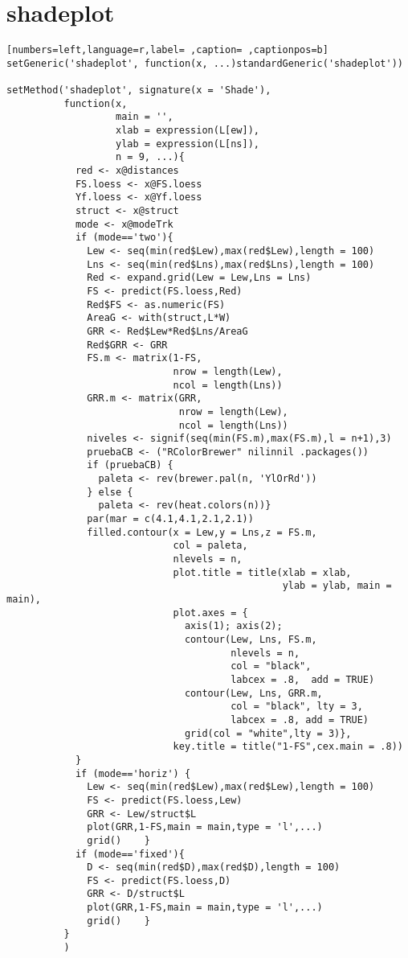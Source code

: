 \section{shadeplot}
\label{sec:org5adaf49}
\begin{lstlisting}[numbers=left,language=r,label= ,caption= ,captionpos=b]
setGeneric('shadeplot', function(x, ...)standardGeneric('shadeplot'))

setMethod('shadeplot', signature(x = 'Shade'),
          function(x,
                   main = '',
                   xlab = expression(L[ew]),
                   ylab = expression(L[ns]),
                   n = 9, ...){
            red <- x@distances
            FS.loess <- x@FS.loess
            Yf.loess <- x@Yf.loess
            struct <- x@struct
            mode <- x@modeTrk
            if (mode=='two'){
              Lew <- seq(min(red$Lew),max(red$Lew),length = 100)
              Lns <- seq(min(red$Lns),max(red$Lns),length = 100)
              Red <- expand.grid(Lew = Lew,Lns = Lns)
              FS <- predict(FS.loess,Red)
              Red$FS <- as.numeric(FS)
              AreaG <- with(struct,L*W)
              GRR <- Red$Lew*Red$Lns/AreaG
              Red$GRR <- GRR
              FS.m <- matrix(1-FS,
                             nrow = length(Lew),
                             ncol = length(Lns))
              GRR.m <- matrix(GRR,
                              nrow = length(Lew),
                              ncol = length(Lns))
              niveles <- signif(seq(min(FS.m),max(FS.m),l = n+1),3)
              pruebaCB <- ("RColorBrewer" nilinnil .packages())
              if (pruebaCB) {
                paleta <- rev(brewer.pal(n, 'YlOrRd'))
              } else {
                paleta <- rev(heat.colors(n))}
              par(mar = c(4.1,4.1,2.1,2.1)) 
              filled.contour(x = Lew,y = Lns,z = FS.m,
                             col = paleta, 
                             nlevels = n,
                             plot.title = title(xlab = xlab,
                                                ylab = ylab, main = main),
                             plot.axes = {
                               axis(1); axis(2);
                               contour(Lew, Lns, FS.m,
                                       nlevels = n, 
                                       col = "black",
                                       labcex = .8,  add = TRUE)
                               contour(Lew, Lns, GRR.m,
                                       col = "black", lty = 3,
                                       labcex = .8, add = TRUE)
                               grid(col = "white",lty = 3)},
                             key.title = title("1-FS",cex.main = .8))
            }
            if (mode=='horiz') {
              Lew <- seq(min(red$Lew),max(red$Lew),length = 100)
              FS <- predict(FS.loess,Lew)
              GRR <- Lew/struct$L
              plot(GRR,1-FS,main = main,type = 'l',...)
              grid()    }
            if (mode=='fixed'){
              D <- seq(min(red$D),max(red$D),length = 100)
              FS <- predict(FS.loess,D)
              GRR <- D/struct$L
              plot(GRR,1-FS,main = main,type = 'l',...)
              grid()    }
          }
          )
\end{lstlisting}
